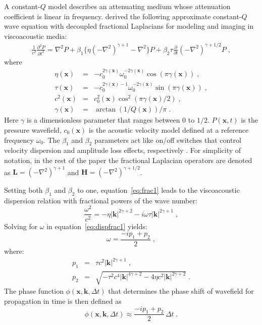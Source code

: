 A constant-$Q$ model \cite[]{kja79} describes an attenuating medium whose  attenuation coefficient is linear in frequency. \cite{zhu14a} derived the following approximate constant-$Q$ wave equation with decoupled fractional Laplacians for modeling and imaging in viscoacoustic media:
\begin{eqnarray}
  \label{eq:frac1}
 \frac{1}{c^2}\frac{\partial^2 P}{\partial t^2} = \nabla^2 P + \beta_1 \{ \eta (-\nabla^2)^{\gamma+1} - \nabla^2 \} P 
 + \beta_2 \tau \frac{\partial}{\partial t}(-\nabla^2)^{\gamma+1/2} P \;, 
\end{eqnarray}
where
\begin{eqnarray}
\eta(\mathbf{x}) &=& -c_0^{2\gamma(\mathbf{x})}\omega_0^{-2\gamma(\mathbf{x})}\cos(\pi \gamma(\mathbf{x})) \;, \\ 
\tau(\mathbf{x}) &=& -c_0^{2\gamma(\mathbf{x})-1}\omega_0^{-2\gamma(\mathbf{x})}\sin(\pi \gamma(\mathbf{x})) \;, \\
c^2(\mathbf{x}) &=& c_0^2(\mathbf{x})\cos^2(\pi\gamma(\mathbf{x})/2) \;, \\
\gamma(\mathbf{x}) &=& \arctan(1/Q(\mathbf{x}))/\pi \;.
\end{eqnarray}
Here $\gamma$ is a dimensionless parameter that ranges between $0$ to $1/2$. $P(\mathbf{x},t)$ is the pressure wavefield, $c_0(\mathbf{x})$ is the acoustic velocity model defined at a reference frequency $\omega_0$. The $\beta_1$ and $\beta_2$ parameters act like on/off switches that control velocity dispersion and amplitude loss effects, respectively \cite[]{zhu14a}. For simplicity of notation, in the rest  of the paper the fractional Laplacian operators are denoted as $\mathbf{L} = (-\nabla^2)^{\gamma+1}$ and $\mathbf{H} = (-\nabla^2)^{\gamma+1/2}$.

Setting both $\beta_1$ and $\beta_2$ to one, equation~\ref{eq:frac1} leads to the viscoacoustic dispersion relation with fractional powers of the wave number:
\begin{equation}
  \label{eq:dispfrac1}
  \frac{\omega^2}{c^2} = -\eta |\mathbf{k}|^{2\gamma +2} - i \omega\tau |\mathbf{k}|^{2\gamma +1} \;, 
\end{equation}
Solving for $\omega$ in equation~\ref{eq:dispfrac1} yields:
\begin{equation}
  \label{eq:omega}
  \omega = \frac{-ip_1 + p_2}{2} \; ,
\end{equation}
where:
\begin{eqnarray}
  \label{eq:p1}
  p_1 &=& \tau c^2|\mathbf{k}|^{2\gamma+1} \; , \\
  \label{eq:p2}
  p_2 &=& \sqrt{-\tau^2c^4|\mathbf{k}|^{4\gamma+2}-4\eta c^2|\mathbf{k}|^{2\gamma+2}} \;.
\end{eqnarray}
The phase function $\phi (\mathbf{x},\mathbf{k},\Delta t)$ that determines the phase shift of  wavefield for propagation in time is then defined as
\begin{equation}
  \label{eq:phasefunc}
  \phi (\mathbf{x},\mathbf{k},\Delta t) \approx \frac{-ip_1 + p_2}{2}\,\Delta t \; .
\end{equation}

